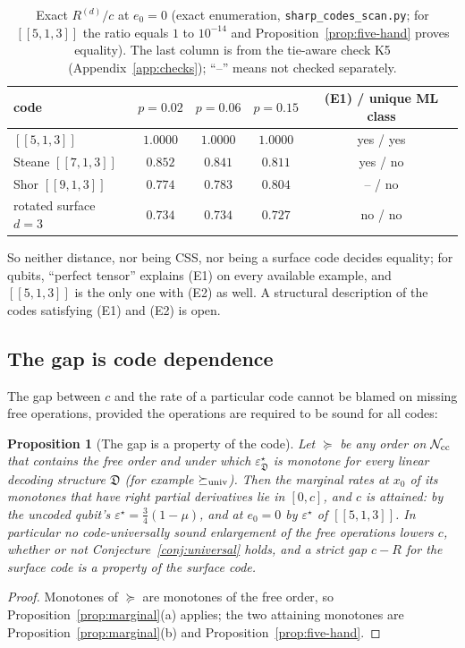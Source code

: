 \documentclass[11pt,a4paper]{article}
\theoremstyle{plain}
\newtheorem{proposition}[theorem]{Proposition}
\theoremstyle{definition}
\theoremstyle{remark}
\newcommand{\err}{\varepsilon^{\star}}
\newcommand{\Ncc}{\mathcal{N}_{\rm cc}}
\begin{document}
\begin{table}[t]
\centering
\begin{tabular}{lcccc}
\toprule
code & $p=0.02$ & $p=0.06$ & $p=0.15$ & (E1) / unique ML class \\
\midrule
$[[5,1,3]]$ & $1.0000$ & $1.0000$ & $1.0000$ & yes / yes \\
Steane $[[7,1,3]]$ & $0.852$ & $0.841$ & $0.811$ & yes / no \\
Shor $[[9,1,3]]$ & $0.774$ & $0.783$ & $0.804$ & -- / no \\
rotated surface $d=3$ & $0.734$ & $0.734$ & $0.727$ & no / no \\
\bottomrule
\end{tabular}
\caption{Exact $R^{(d)}/c$ at $e_0=0$ (exact enumeration, \texttt{sharp\_codes\_scan.py}; for $[[5,1,3]]$ the ratio equals $1$ to $10^{-14}$ and Proposition~\ref{prop:five-hand} proves equality). The last column is from the tie-aware check K5 (Appendix~\ref{app:checks}); ``--'' means not checked separately.}
\label{tab:codes}
\end{table}

\noindent So neither distance, nor being CSS, nor being a surface code decides equality; for qubits, ``perfect tensor'' explains (E1) on every available example, and $[[5,1,3]]$ is the only one with (E2) as well. A structural description of the codes satisfying (E1) and (E2) is open.

\subsection{The gap is code dependence}

The gap between $c$ and the rate of a particular code cannot be blamed on missing free operations, provided the operations are required to be sound for all codes:

\begin{proposition}[The gap is a property of the code]\label{prop:gap-A}
Let $\succeq$ be any order on $\Ncc$ that contains the free order and under which $\err_{\mathfrak D}$ is monotone for every linear decoding structure $\mathfrak D$ (for example $\succeq_{\rm univ}$). Then the marginal rates at $x_0$ of its monotones that have right partial derivatives lie in $[0,c]$, and $c$ is attained: by the uncoded qubit's $\err=\tfrac34(1-\mu)$, and at $e_0=0$ by $\err$ of $[[5,1,3]]$. In particular no code-universally sound enlargement of the free operations lowers $c$, whether or not Conjecture~\ref{conj:universal} holds, and a strict gap $c-R$ for the surface code is a property of the surface code.
\end{proposition}
\begin{proof}
Monotones of $\succeq$ are monotones of the free order, so Proposition~\ref{prop:marginal}(a) applies; the two attaining monotones are Proposition~\ref{prop:marginal}(b) and Proposition~\ref{prop:five-hand}.
\end{proof}
\end{document}
